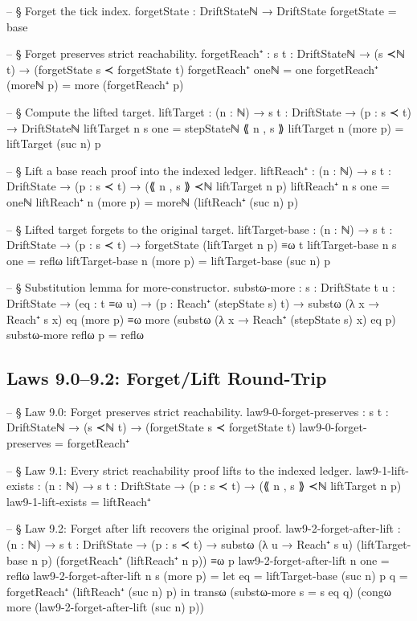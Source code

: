 \documentclass[11pt,a4paper]{book}
\begin{document}
\begin{code}
-- § Forget the tick index.
forgetState : DriftStateℕ → DriftState
forgetState = base

-- § Forget preserves strict reachability.
forgetReach⁺ : {s t : DriftStateℕ} → (s ≺ℕ t) → (forgetState s ≺ forgetState t)
forgetReach⁺ oneℕ = one
forgetReach⁺ (moreℕ p) = more (forgetReach⁺ p)

-- § Compute the lifted target.
liftTarget : (n : ℕ) → {s t : DriftState} → (p : s ≺ t) → DriftStateℕ
liftTarget n {s} one = stepStateℕ ⟪ n , s ⟫
liftTarget n (more p) = liftTarget (suc n) p

-- § Lift a base reach proof into the indexed ledger.
liftReach⁺ : (n : ℕ) → {s t : DriftState} → (p : s ≺ t) → (⟪ n , s ⟫ ≺ℕ liftTarget n p)
liftReach⁺ n {s} one = oneℕ
liftReach⁺ n (more p) = moreℕ (liftReach⁺ (suc n) p)

-- § Lifted target forgets to the original target.
liftTarget-base : (n : ℕ) → {s t : DriftState} → (p : s ≺ t) → forgetState (liftTarget n p) ≡ω t
liftTarget-base n {s} one = reflω
liftTarget-base n (more p) = liftTarget-base (suc n) p

-- § Substitution lemma for more-constructor.
substω-more :
  {s : DriftState} {t u : DriftState} →
  (eq : t ≡ω u) →
  (p : Reach⁺ (stepState s) t) →
  substω (λ x → Reach⁺ s x) eq (more p) ≡ω more (substω (λ x → Reach⁺ (stepState s) x) eq p)
substω-more reflω p = reflω
\end{code}

\subsection{Laws 9.0--9.2: Forget/Lift Round-Trip}

\begin{code}
-- § Law 9.0: Forget preserves strict reachability.
law9-0-forget-preserves : {s t : DriftStateℕ} → (s ≺ℕ t) → (forgetState s ≺ forgetState t)
law9-0-forget-preserves = forgetReach⁺

-- § Law 9.1: Every strict reachability proof lifts to the indexed ledger.
law9-1-lift-exists : (n : ℕ) → {s t : DriftState} → (p : s ≺ t) → (⟪ n , s ⟫ ≺ℕ liftTarget n p)
law9-1-lift-exists = liftReach⁺

-- § Law 9.2: Forget after lift recovers the original proof.
law9-2-forget-after-lift :
  (n : ℕ) → {s t : DriftState} →
  (p : s ≺ t) →
  substω (λ u → Reach⁺ s u) (liftTarget-base n p) (forgetReach⁺ (liftReach⁺ n p)) ≡ω p
law9-2-forget-after-lift n one = reflω
law9-2-forget-after-lift n {s} (more p) =
  let
    eq = liftTarget-base (suc n) p
    q  = forgetReach⁺ (liftReach⁺ (suc n) p)
  in
  transω
    (substω-more {s = s} eq q)
    (congω more (law9-2-forget-after-lift (suc n) p))
\end{code}
\end{document}
